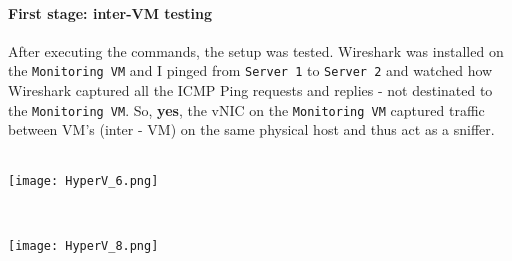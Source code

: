\paragraph{First stage: inter-VM testing}
After executing the commands, the setup was tested. Wireshark was installed on the \texttt{Monitoring VM} and I pinged from \texttt{Server 1} to \texttt{Server 2} and watched how Wireshark captured all the ICMP Ping requests and replies - not destinated to the \texttt{Monitoring VM}. So, \textbf{yes}, the vNIC on the \texttt{Monitoring VM} captured traffic between VM's (inter - VM) on the same physical host and thus act as a sniffer.
$\;$ \\ \\
\noindent\begin{minipage}{\textwidth}
    \centering
    \texttt{[image: HyperV\_6.png]}
\label{fig:network}
\end{minipage}
$\;$ \\ \\
\noindent\begin{minipage}{\textwidth}
    \centering
    \texttt{[image: HyperV\_8.png]}
\label{fig:network}
\end{minipage}
$\;$ \\ \\
